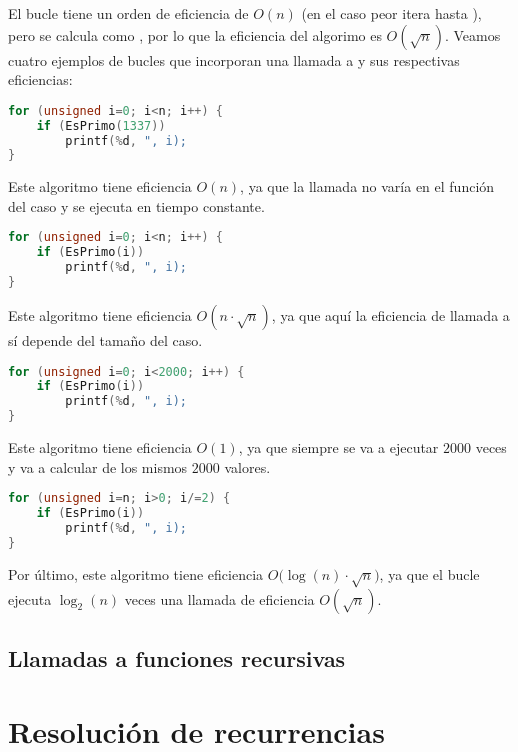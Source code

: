 El bucle  tiene un orden de eficiencia de $O(n)$ (en el caso peor itera hasta ), pero  se calcula como , por lo que la eficiencia del algorimo es $O(\surd n)$.
Veamos cuatro ejemplos de bucles que incorporan una llamada a  y sus respectivas eficiencias:

\begin{lstlisting}[language=C]
for (unsigned i=0; i<n; i++) {
	if (EsPrimo(1337))
		printf(%d, ", i);
}
\end{lstlisting}

Este algoritmo tiene eficiencia $O(n)$, ya que la llamada  no varía en el función del caso y se ejecuta en tiempo constante.

\begin{lstlisting}[language=C]
for (unsigned i=0; i<n; i++) {
	if (EsPrimo(i))
		printf(%d, ", i);
}
\end{lstlisting}

Este algoritmo tiene eficiencia $O(n\cdot\surd n)$, ya que aquí la eficiencia de llamada a  sí depende del tamaño del caso.

\begin{lstlisting}[language=C]
for (unsigned i=0; i<2000; i++) {
	if (EsPrimo(i))
		printf(%d, ", i);
}
\end{lstlisting}

Este algoritmo tiene eficiencia $O(1)$, ya que siempre se va a ejecutar $2000$ veces y va a calcular  de los mismos $2000$ valores.

\pagebreak

\begin{lstlisting}[language=C]
for (unsigned i=n; i>0; i/=2) {
	if (EsPrimo(i))
		printf(%d, ", i);
}
\end{lstlisting}

Por último, este algoritmo tiene eficiencia $O\big(\log(n)\cdot\surd n\big)$, ya que el bucle  ejecuta $\log_2(n)$ veces una llamada de eficiencia $O(\surd n)$.

\subsection{Llamadas a funciones recursivas}

\section{Resolución de recurrencias}
